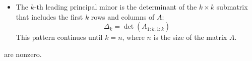 \begin{enumerate}
\begin{theorem}
{\begin{itemize}
                \item The $k$-th leading principal minor is the determinant of the $k \times k$ submatrix that includes the first $k$ rows and columns of $A$:
                \begin{equation*}
                    \Delta_k = \det(A_{1:k, 1:k})
                \end{equation*}
                This pattern continues until $k = n$, where $n$ is the size of the matrix $A$.
            \end{itemize}
        } are nonzero.
    \end{theorem}
\end{enumerate}
